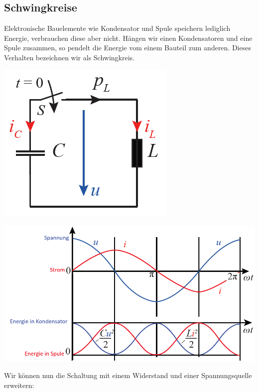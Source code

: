\newpage

\subsection{Schwingkreise}
Elektronische Bauelemente wie Kondensator und Spule speichern lediglich Energie, verbrauchen diese aber nicht. Hängen wir einen Kondensatoren und eine Spule zusammen, so pendelt die Energie vom einem Bauteil zum anderen.
Dieses Verhalten bezeichnen wir als Schwingkreis. \\

\begin{center}

\includegraphics[scale=0.5]{img/schwingkreis.png}

\hspace{-3cm}
\includegraphics[scale=0.5]{img/schwingkreis_2.png}

\end{center}

Wir können nun die Schaltung mit einem Widerstand und einer Spannungsquelle erweitern: \\

